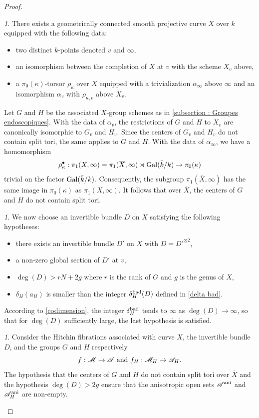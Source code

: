 \documentclass[12pt,english]{smfart}
\numberwithin{equation}{subsection}
\theoremstyle{remark}
\newtheorem{numero}[equation]{}
\newcommand\calA{{\mathscr A}}
\newcommand\calM{{\mathscr M}}
\newcommand\Gal{{\rm Gal}}
\newcommand\ovl[1]{{\overline #1}}
\newcommand\ani{{\rm ani}}
\begin{document}
\begin{proof}
\begin{numero}
There exists a geometrically connected smooth projective curve $X$ over
$k$ equipped with the following data:
\begin{itemize}
 \item two distinct $k$-points denoted $v$ and $\infty$,
 \item an isomorphism between the completion of $X$ at $v$ with the
   scheme $X_v$ above,
 \item a $\pi_0(\kappa)$-torsor $\rho_\kappa$ over $X$ equipped with a
   trivialization $\alpha_\infty$ above $\infty$ and an
   isomorphism $\alpha_v$ with $\rho_{\kappa,v}$ above
   $X_v$.
\end{itemize}
Let $G$ and $H$ be the associated $X$-group schemes as in
\ref{subsection : Groupes endoscopiques}. With the data of $\alpha_v$,
the restrictions of $G$ and $H$ to $X_v$ are canonically isomorphic
to $G_v$ and $H_v$. Since the centers of $G_v$ and $H_v$ do not contain
split tori, the same applies to $G$ and $H$. With the
data of $\alpha_\infty$, we have a homomorphism
$$\rho_\kappa^\bullet:\pi_1(X,\infty)=\pi_1(\ovl X,\infty)\rtimes \Gal(\bar k/ k)
\rightarrow \pi_0(\kappa)
$$
trivial on the factor $\Gal(\bar k/ k)$. Consequently, the subgroup
$\pi_1(\ovl X,\infty)$ has the same image in $\pi_0(\kappa)$ as
$\pi_1(X,\infty)$. It follows that over $\ovl X$, the centers of $G$ and $H$ do not
contain split tori.
\end{numero}

\begin{numero}
We now choose an invertible bundle $D$ on $X$ satisfying the
following hypotheses:
\begin{itemize}
 \item there exists an invertible bundle $D'$ on $X$ with $D={D'}^{\otimes
   2}$,
 \item a non-zero global section of $D'$ at $v$,
 \item $\deg(D) > rN+2g$ where $r$ is the rank of $G$ and $g$ is the genus
   of $X$,
 \item $\delta_H(a_H)$ is smaller than the integer $\delta_H^{\rm bad}(D)$
   defined in \ref{delta bad}.
\end{itemize}
According to \ref{codimension}, the integer $\delta_H^{\rm bad}$ tends to
$\infty$ as $\deg(D)\rightarrow \infty$, so that for $\deg(D)$
sufficiently large, the last hypothesis is satisfied.
\end{numero}

\begin{numero}
Consider the Hitchin fibrations associated with curve $X$, the
invertible bundle $D$, and the groups $G$ and $H$ respectively
$$f:\calM\rightarrow \calA \ {\rm and}\ f_H:\calM_H\rightarrow \calA_H.$$
The hypothesis that the centers of $G$ and $H$ do not contain split tori
over $\ovl X$ and the hypothesis $\deg(D)>2g$ ensure that the
anisotropic open sets $\calA^\ani$ and $\calA_H^\ani$ are non-empty.
\end{numero}


\end{proof}
\end{document}
